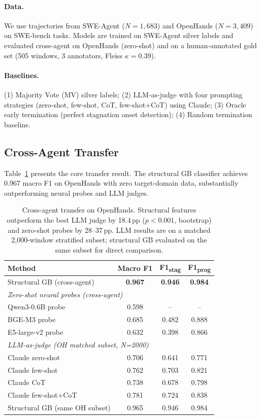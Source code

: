 \documentclass[11pt,a4paper]{article}
\begin{document}
\paragraph{Data.}
We use trajectories from SWE-Agent ($N{=}1{,}683$) and OpenHands ($N{=}3{,}409$) on SWE-bench tasks.
Models are trained on SWE-Agent silver labels and evaluated cross-agent on OpenHands (zero-shot) and on a human-annotated gold set (505 windows, 3 annotators, Fleiss $\kappa{=}0.39$).

\paragraph{Baselines.}
(1) Majority Vote (MV) silver labels; (2) LLM-as-judge with four prompting strategies (zero-shot, few-shot, CoT, few-shot+CoT) using Claude; (3) Oracle early termination (perfect stagnation onset detection); (4) Random termination baseline.

\subsection{Cross-Agent Transfer}

Table~\ref{tab:cross_agent} presents the core transfer result. The structural GB classifier achieves 0.967 macro F1 on OpenHands with zero target-domain data, substantially outperforming neural probes and LLM judges.

\begin{table}[t]
\centering
\small
\begin{tabular}{lccc}
\toprule
\textbf{Method} & \textbf{Macro F1} & \textbf{F1\textsubscript{stag}} & \textbf{F1\textsubscript{prog}} \\
\midrule
Structural GB (cross-agent) & \textbf{0.967} & \textbf{0.946} & \textbf{0.984} \\
\midrule
\multicolumn{4}{l}{\emph{Zero-shot neural probes (cross-agent)}} \\
\quad Qwen3-0.6B probe & 0.598 & -- & -- \\
\quad BGE-M3 probe & 0.685 & 0.482 & 0.888 \\
\quad E5-large-v2 probe & 0.632 & 0.398 & 0.866 \\
\midrule
\multicolumn{4}{l}{\emph{LLM-as-judge (OH matched subset, N=2000)}} \\
\quad Claude zero-shot & 0.706 & 0.641 & 0.771 \\
\quad Claude few-shot & 0.762 & 0.703 & 0.821 \\
\quad Claude CoT & 0.738 & 0.678 & 0.798 \\
\quad Claude few-shot+CoT & 0.781 & 0.724 & 0.838 \\
\midrule
Structural GB (same OH subset) & 0.965 & 0.946 & 0.984 \\
\bottomrule
\end{tabular}
\caption{Cross-agent transfer on OpenHands. Structural features outperform the best LLM judge by 18.4\,pp ($p{<}0.001$, bootstrap) and zero-shot probes by 28--37\,pp. LLM results are on a matched 2,000-window stratified subset; structural GB evaluated on the same subset for direct comparison.}
\label{tab:cross_agent}
\end{table}
\end{document}

